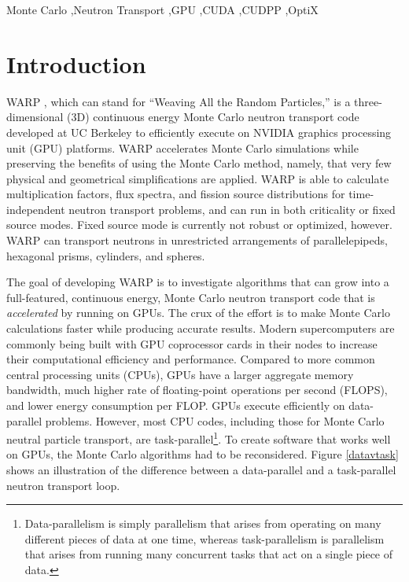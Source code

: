 \documentclass[preprint,12pt]{elsarticle}
\begin{document}
\begin{frontmatter}
\begin{abstract}
\end{abstract}

\begin{keyword}
Monte Carlo \sep Neutron Transport \sep GPU \sep CUDA \sep CUDPP \sep OptiX


\end{keyword}

\end{frontmatter}

\linenumbers


\section{Introduction}
\label{sec:intro}

WARP \cite{algorithms}, which can stand for ``Weaving All the Random Particles,'' is a three-dimensional (3D) continuous energy Monte Carlo neutron transport code developed at UC Berkeley to efficiently execute on NVIDIA graphics processing unit (GPU) platforms.  WARP accelerates Monte Carlo simulations while preserving the benefits of using the Monte Carlo method, namely, that very few physical and geometrical simplifications are applied.  WARP is able to calculate multiplication factors, flux spectra, and fission source distributions for time-independent neutron transport problems, and can run in both criticality or fixed source modes. Fixed source mode is currently not robust or optimized, however.  WARP can transport neutrons in unrestricted arrangements of parallelepipeds, hexagonal prisms, cylinders, and spheres.

The goal of developing WARP is to investigate algorithms that can grow into a full-featured, continuous energy, Monte Carlo neutron transport code that is \emph{accelerated} by running on GPUs.  The crux of the effort is to make Monte Carlo calculations faster while producing accurate results.  Modern supercomputers are commonly being built with GPU coprocessor cards in their nodes to increase their computational efficiency and performance.  Compared to more common central processing units (CPUs), GPUs have a larger aggregate memory bandwidth, much higher rate of floating-point operations per second (FLOPS), and lower energy consumption per FLOP.  GPUs execute efficiently on data-parallel problems. However, most CPU codes, including those for Monte Carlo neutral particle transport, are task-parallel\footnote{Data-parallelism is simply parallelism that arises from operating on many different pieces of data at one time, whereas task-parallelism is parallelism that arises from running many concurrent tasks that act on a single piece of data.}.  To create software that works well on GPUs, the Monte Carlo algorithms had to be reconsidered.   Figure \ref{datavtask} shows an illustration of the difference between a data-parallel and a task-parallel neutron transport loop.
\end{document}
